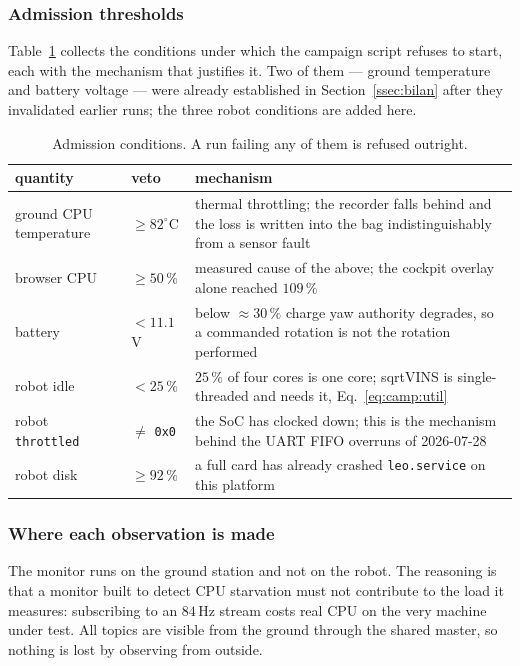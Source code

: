 \subsubsection{Admission thresholds}

Table~\ref{tab:camp:seuils} collects the conditions under which the campaign
script refuses to start, each with the mechanism that justifies it. Two of them
--- ground temperature and battery voltage --- were already established in
Section~\ref{ssec:bilan} after they invalidated earlier runs; the three robot
conditions are added here.

\begin{table}[htbp]
\centering
\caption{Admission conditions. A run failing any of them is refused outright.}
\label{tab:camp:seuils}
\small
\begin{tabular}{p{3.1cm} p{1.9cm} p{7.6cm}}
\toprule
quantity & veto & mechanism \\
\midrule
ground CPU temperature & $\ge 82^{\circ}$C & thermal throttling; the recorder
falls behind and the loss is written into the bag indistinguishably from a
sensor fault \\[2pt]
browser CPU            & $\ge 50\,\%$      & measured cause of the above; the
cockpit overlay alone reached $109\,\%$ \\[2pt]
battery                & $<11.1$\,V        & below $\approx30\,\%$ charge yaw
authority degrades, so a commanded rotation is not the rotation performed \\[2pt]
robot idle             & $<25\,\%$         & $25\,\%$ of four cores is one core;
sqrtVINS is single-threaded and needs it, Eq.~\eqref{eq:camp:util} \\[2pt]
robot \texttt{throttled} & $\ne$ \texttt{0x0} & the SoC has clocked down; this
is the mechanism behind the UART FIFO overruns of 2026-07-28 \\[2pt]
robot disk             & $\ge 92\,\%$      & a full card has already crashed
\texttt{leo.service} on this platform \\
\bottomrule
\end{tabular}
\end{table}

\subsubsection{Where each observation is made}

The monitor runs on the ground station and not on the robot. The reasoning is
that a monitor built to detect CPU starvation must not contribute to the load
it measures: subscribing to an $84$\,Hz stream costs real CPU on the very
machine under test. All topics are visible from the ground through the shared
master, so nothing is lost by observing from outside.

